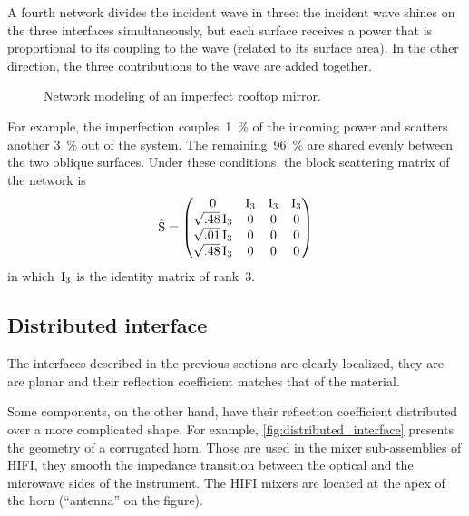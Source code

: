 A fourth network divides the incident wave in three: the incident wave shines on the three interfaces simultaneously, but each surface receives a power that is proportional to its coupling to the wave (related to its surface area).
In the other direction, the three contributions to the wave are added together.

\begin{figure}
    \centering
    
    \caption{Network modeling of an imperfect rooftop mirror.}
    \label{fig:rooftop_networks}
\end{figure}

\begin{samepage}
For example, the imperfection couples~\SI{1}{\percent} of the incoming power and scatters another \SI{3}{\percent} out of the system.
The remaining~\SI{96}{\percent} are shared evenly between the two oblique surfaces.
Under these conditions, the block scattering matrix of the network is
\begin{equation}
    \hat{\mathrm{S}}
    =
    \begin{pmatrix}
        0 & \mathrm{I}_3 & \mathrm{I}_3 & \mathrm{I}_3\\
        \sqrt{.48}\,\mathrm{I}_3 & 0 & 0 & 0\\ 
        \sqrt{.01}\,\mathrm{I}_3 & 0 & 0 & 0\\
        \sqrt{.48}\,\mathrm{I}_3 & 0 & 0 & 0
    \end{pmatrix}
\end{equation}
in which~$\mathrm{I}_3$ is the identity matrix of rank~3.
\end{samepage}




\subsection{Distributed interface}
\label{sec:distributed_interface}

The interfaces described in the previous sections are clearly localized, they are are planar and their reflection coefficient matches that of the material.

Some components, on the other hand, have their reflection coefficient distributed over a more complicated shape.
For example, \cref{fig:distributed_interface} presents the geometry of a corrugated horn.
Those are used in the mixer sub-assemblies of HIFI, they smooth the impedance transition between the optical and the microwave sides of the instrument.
The HIFI mixers are located at the apex of the horn (``antenna'' on the figure).

